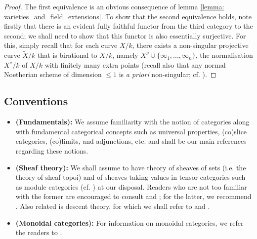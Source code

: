             \begin{proof}
                The first equivalence is an obvious consequence of lemma \ref{lemma: varieties_and_field_extensions}. To show that the second equivalence holds, note firstly that there is an evident fully faithful functor from the third category to the second; we shall need to show that this functor is also essentially surjective. For this, simply recall that for each curve $X/k$, there exists a non-singular projective curve $\tilde{X}/k$ that is birational to $X/k$, namely $X^{\nu} \cup \{\infty_1, ..., \infty_n\}$, the normalisation $X^{\nu}/k$ of $X/k$ with finitely many extra points (recall also that any normal Noetherian scheme of dimension $\leq 1$ is \textit{a priori} non-singular; cf. \cite[\href{https://stacks.math.columbia.edu/tag/0BX2}{Tag 0BX2}]{stacks}).
            \end{proof}
        
    \subsection{Conventions}
        \begin{convention} \label{conv: category_theory}
            \noindent
            \begin{itemize}
                \item \textbf{(Fundamentals):} We assume familiarity with the notion of categories along with fundamental categorical concepts such as universal properties, (co)slice categories, (co)limits, and adjunctions, etc. \cite{maclane} and \cite[\href{https://stacks.math.columbia.edu/tag/0011}{Tag 0011}]{stacks} shall be our main references regarding these notions.
                \item \textbf{(Sheaf theory):} We shall assume to have theory of sheaves of sets (i.e. the theory of sheaf topoi) and of sheaves taking values in tensor categories such as module categories (cf. \cite{EGNO}) at our disposal. Readers who are not too familiar with the former are encouraged to consult \cite{sga4} and \cite[\href{https://stacks.math.columbia.edu/tag/00UZ}{Tag 00UZ}]{stacks}; for the latter, we recommend \cite[\href{https://stacks.math.columbia.edu/tag/006A}{Tag 006A}, \href{https://stacks.math.columbia.edu/tag/01AC}{Tag 01AC}, and \href{https://stacks.math.columbia.edu/tag/03A4}{Tag 03A4}]{stacks}. Also related is descent theory, for which we shall refer to \cite{vistoli_descent} and \cite[\href{https://stacks.math.columbia.edu/tag/0266}{Tag 0266} and \href{https://stacks.math.columbia.edu/tag/0238}{Tag 0238}]{stacks}.
                \item \textbf{(Monoidal categories):} For information on monoidal categories, we refer the readers to \cite{EGNO}.
            \end{itemize}
        \end{convention}
        
